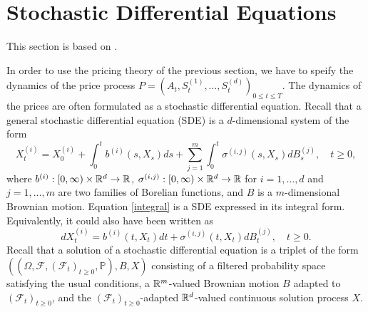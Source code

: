 \section{Stochastic Differential Equations}\label{section:SDE}
This section is based on \cite{Orimarsnoter}.

In order to use the pricing theory of the previous section, we have to speify the dynamics of the price process $P=(A_{t},S_{t}^{(1)},\dots,S_{t}^{(d)})_{0\leq t\leq T}$. The dynamics of the prices are often formulated as a stochastic differential equation. Recall that a general stochastic differential equation (SDE) is a $d$-dimensional system of the form
\begin{equation}\label{integral}
    X_{t}^{(i)}=X_{0}^{(i)}+ \int_{0}^{t}b^{(i)}(s,X_{s})ds+\sum_{j=1}^{m}\int_{0}^{t}\sigma^{(i,j)}(s,X_{s})dB_{s}^{(j)},\quad t\geq 0,
\end{equation}
where $b^{(i)}:[0,\infty)\times \mathbb{R}^{d}\to \mathbb{R}$, $\sigma^{(i,j)}:[0,\infty)\times\mathbb{R}^{d}\to\mathbb{R}$ for $i=1,\dots,d$ and $j=1,\dots,m$ are two families of Borelian functions, and $B$ is a $m$-dimensional Brownian motion. Equation \eqref{integral} is a SDE expressed in its integral form. Equivalently, it could also have been written as
\begin{equation}
    dX_{t}^{(i)}= b^{(i)}(t,X_{t})dt +\sigma^{(i,j)}(t,X_{t})dB_{t}^{(j)}, \quad t\geq 0.
\end{equation}
Recall that a solution of a stochastic differential equation is a triplet of the form \newline$\left((\Omega,\mathcal{F},(\mathcal{F}_{t})_{t\geq 0},\mathbb{P}),B,X\right)$ consisting of a filtered probability space satisfying the usual conditions, a $\mathbb{R}^{m}$-valued Brownian motion $B$ adapted to $(\mathcal{F}_{t})_{t\geq 0}$, and the $(\mathcal{F}_{t})_{t\geq 0}$-adapted $\mathbb{R}^{d}$-valued continuous solution process $X$.

